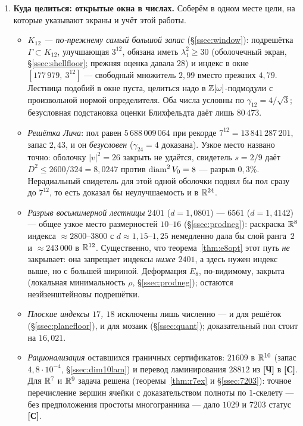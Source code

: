 \begin{enumerate}[leftmargin=1.5em]
\item \textbf{Куда целиться: открытые окна в числах.} Соберём в одном месте
цели, на которые указывают экраны и учёт этой работы.
\begin{itemize}[leftmargin=1.2em,itemsep=1pt]
\item \emph{$K_{12}$ --- по-прежнему самый большой запас} (\S\ref{ssec:window}):
подрешётка $\Gamma\subset K_{12}$, улучшающая $3^{12}$, обязана иметь
$\lambda_1^2\ge30$ (оболочечный экран, \S\ref{ssec:shellfloor}; прежняя оценка
давала $28$) и индекс в окне $[177\,979,\ 3^{12}]$ --- свободный множитель
$2{,}99$ вместо прежних $4{,}79$. Лестница подобий в окне пуста, целиться надо
в $\mathbb{Z}[\omega]$-подмодули с произвольной нормой определителя. Оба числа условны
по $\gamma_{12}=4/\sqrt3$; безусловная подстановка оценки Блихфельдта даёт лишь
$80\,473$.
\item \emph{Решётка Лича}: пол равен $5\,688\,009\,064$ при рекорде
$7^{12}=13\,841\,287\,201$, запас $2{,}43$, и он \emph{безусловен}
($\gamma_{24}=4$ доказана). Узкое место названо точно: оболочку $|v|^2=26$
закрыть не удаётся, свидетель $s=2/9$ даёт $D^2\le2600/324=8{,}0247$ против
$\operatorname{diam}^2V_0=8$ --- разрыв $0{,}3\%$. Нерадиальный свидетель для этой одной
оболочки поднял бы пол сразу до $7^{12}$, то есть доказал бы неулучшаемость
и в $\mathbb{R}^{24}$.
\item \emph{Разрыв восьмимерной лестницы} $2401$ ($d=1{,}0801$) --- $6561$
($d=1{,}4142$) --- общее узкое место размерностей $10$--$16$
(\S\ref{ssec:prodneg}): раскраска $\mathbb{R}^8$ индекса ${\approx}2800$--$3800$ с
$d\approx1{,}15$--$1{,}25$ немедленно дала бы слой ранга~$2$ и
${\approx}243\,000$ в $\mathbb{R}^{12}$. Существенно, что теорема~\ref{thm:e8opt}
этот путь \emph{не} закрывает: она запрещает индексы \emph{ниже} $2401$, а
здесь нужен индекс выше, но с большей шириной. Деформация $E_8$, по-видимому,
закрыта (локальная минимальность $\rho$, \S\ref{ssec:prodneg}); остаются
неэйзенштейновы подрешётки.
\item \emph{Плоские индексы $17$, $18$} исключены лишь численно --- и для
решёток (\S\ref{ssec:planefloor}), и для мозаик (\S\ref{ssec:quant});
доказательный пол стоит на $16{,}021$.
\item \emph{Рационализация} оставшихся граничных сертификатов: $21609$ в
$\mathbb{R}^{10}$ (запас $4{,}8\cdot10^{-4}$, \S\ref{ssec:dim10lam}) и перевод
ламинирования $28812$ из \textbf{[Ч]} в \textbf{[С]}. Для $\mathbb{R}^7$ и $\mathbb{R}^9$
задача решена (теоремы~\ref{thm:r7ex} и \S\ref{ssec:7203}): точное
перечисление вершин ячейки с доказательством полноты по $1$-скелету --- без
предположения простоты многогранника --- дало $1029$ и $7203$ статус
\textbf{[С]}.


\end{itemize}
\end{enumerate}
